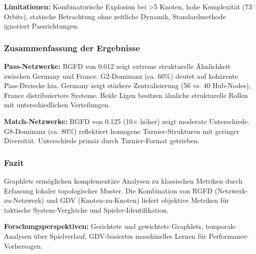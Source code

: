 \textbf{Limitationen:} Kombinatorische Explosion bei >5 Knoten, hohe Komplexität (73 Orbits), statische Betrachtung ohne zeitliche Dynamik, Standardmethode ignoriert Passrichtungen.

\subsubsection{Zusammenfassung der Ergebnisse}

\textbf{Pass-Netzwerke:} RGFD von 0.012 zeigt extreme strukturelle Ähnlichkeit zwischen Germany und France. G2-Dominanz (ca. 60\%) deutet auf kohärente Pass-Dreiecke hin. Germany zeigt stärkere Zentralisierung (56 vs. 40 Hub-Nodes), France distribuiertere Systeme. Beide Ligen besitzen ähnliche strukturelle Rollen mit unterschiedlichen Verteilungen.

\textbf{Match-Netzwerke:} RGFD von 0.125 (10× höher) zeigt moderate Unterschiede. G8-Dominanz (ca. 80\%) reflektiert homogene Turnier-Strukturen mit geringer Diversität. Unterschiede primär durch Turnier-Format getrieben.

\subsubsection{Fazit}

Graphlets ermöglichen komplementäre Analysen zu klassischen Metriken durch Erfassung lokaler topologischer Muster. Die Kombination von RGFD (Netzwerk-zu-Netzwerk) und GDV (Knoten-zu-Knoten) liefert objektive Metriken für taktische System-Vergleiche und Spieler-Identifikation.

\textbf{Forschungsperspektiven:} Gerichtete und gewichtete Graphlets, temporale Analysen über Spielverlauf, GDV-basiertes maschinelles Lernen für Performance-Vorhersagen.
